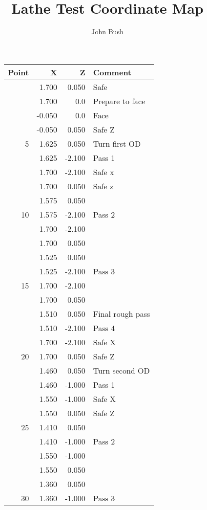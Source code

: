 \documentclass{article}
\begin{document}
\title{Lathe Test Coordinate Map}
\author{John Bush}

\maketitle

\centering
\begin{figure}[H]
\begin{tabular}{rrrl} \toprule
	Point & X & Z & Comment \\
	\midrule
	& 1.700 & 0.050 & Safe \\
	& 1.700 & 0.0 & Prepare to face \\
	& -0.050 & 0.0 & Face \\
	& -0.050 & 0.050 & Safe Z \\
	5 & 1.625 & 0.050 & Turn first OD \\
	& 1.625 & -2.100 & Pass 1 \\
	& 1.700 & -2.100 & Safe x \\
	& 1.700 & 0.050 & Safe z \\
	& 1.575 & 0.050 & \\
	10 & 1.575 & -2.100 & Pass 2 \\
	& 1.700 & -2.100 & \\
	& 1.700 & 0.050 & \\
	& 1.525 & 0.050 & \\
	& 1.525 & -2.100 & Pass 3 \\
	15 & 1.700 & -2.100 & \\
	& 1.700 & 0.050 & \\
	& 1.510 & 0.050 & Final rough pass \\
	& 1.510 & -2.100 & Pass 4 \\
	& 1.700 & -2.100 & Safe X \\
	20 & 1.700 & 0.050 & Safe Z \\
	& 1.460 & 0.050 & Turn second OD \\
	& 1.460 & -1.000 & Pass 1 \\
	& 1.550 & -1.000 & Safe X \\
	& 1.550 & 0.050 & Safe Z \\
	25 & 1.410 & 0.050 & \\
	& 1.410 & -1.000 & Pass 2 \\
	& 1.550 & -1.000 & \\
	& 1.550 & 0.050 & \\
	& 1.360 & 0.050 & \\
	30 & 1.360 & -1.000 & Pass 3 \\
	\bottomrule
\end{tabular}
\end{figure}
\end{document}
